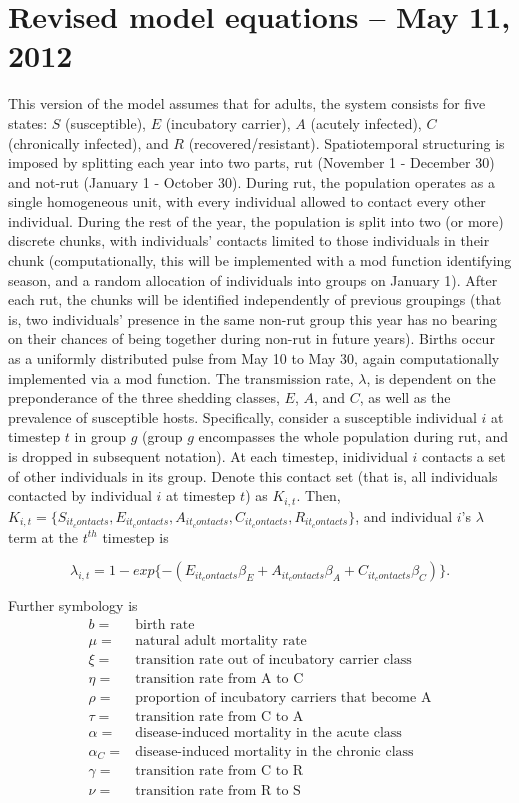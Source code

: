 \documentclass[fleqn]{article}
\begin{document}
\section*{Revised model equations -- May 11, 2012}
This version of the model assumes that for adults, the system consists for five states: $S$ (susceptible), $E$ (incubatory carrier), $A$ (acutely infected), $C$ (chronically infected), and $R$ (recovered/resistant). Spatiotemporal structuring is imposed by splitting each year into two parts, rut (November 1 - December 30) and not-rut (January 1 - October 30).  During rut, the population operates as a single homogeneous unit, with every individual allowed to contact every other individual.  During the rest of the year, the population is split into two (or more) discrete chunks, with individuals' contacts limited to those individuals in their chunk (computationally, this will be implemented with a mod function identifying season, and a random allocation of individuals into groups on January 1).  After each rut, the chunks will be identified independently of previous groupings (that is, two individuals' presence in the same non-rut group this year has no bearing on their chances of being together during non-rut in future years).  Births occur as a uniformly distributed pulse from May 10 to May 30, again computationally implemented via a mod function.  The transmission rate, $\lambda$, is dependent on the preponderance of the three shedding classes, $E$, $A$, and $C$, as well as the prevalence of susceptible hosts.  Specifically, consider a susceptible individual $i$ at timestep $t$ in group $g$ (group $g$ encompasses the whole population during rut, and is dropped in subsequent notation).  At each timestep, inidividual $i$ contacts a set of other individuals in its group.  Denote this contact set (that is, all individuals contacted by individual $i$ at timestep $t$) as $K_{i,t}$.  Then, $K_{i,t} = \{S_{it_contacts}, E_{it_contacts}, A_{it_contacts}, C_{it_contacts}, R_{it_contacts} \}$, and individual $i$'s $\lambda$ term at the $t^{th}$ timestep is

\[\lambda_{i,t} = 1-exp\{-(E_{it_contacts}\beta_{E}+A_{it_contacts}\beta_{A}+C_{it_contacts}\beta_{C})\}.\]

Further symbology is
\[\begin{array}{cl}
b =  & \mbox{birth rate} \\
\mu =  & \mbox{natural adult mortality rate}\\
\xi =  & \mbox{transition rate out of incubatory carrier class}\\
\eta =  & \mbox{transition rate from A to C}\\
\rho =  & \mbox{proportion of incubatory carriers that become A}\\
\tau =  & \mbox{transition rate from C to A}\\
\alpha =  & \mbox{disease-induced mortality in the acute class}\\
\alpha_{C} =  & \mbox{disease-induced mortality in the chronic class}\\
\gamma =  & \mbox{transition rate from C to R}\\
\nu =  & \mbox{transition rate from R to S}\\
\end{array}\]
\end{document}

